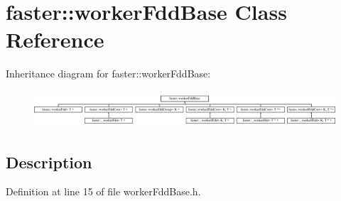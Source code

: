 \hypertarget{classfaster_1_1workerFddBase}{}\section{faster\+:\+:worker\+Fdd\+Base Class Reference}
\label{classfaster_1_1workerFddBase}
Inheritance diagram for faster\+:\+:worker\+Fdd\+Base\+:\begin{figure}[H]
\begin{center}
\leavevmode
\includegraphics[height=1.365854cm]{classfaster_1_1workerFddBase}
\end{center}
\end{figure}


\subsection{Description}


Definition at line 15 of file worker\+Fdd\+Base.\+h.

